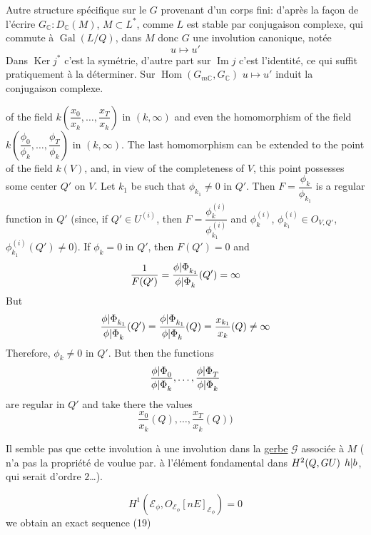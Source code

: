 Autre structure spécifique sur le $G$ provenant d'un corps fini: d'après la façon de l'écrire $G_{\mathbb C}:D_{\mathbb C}(M)$, $M\subset L^*$, comme $L$ est stable par conjugaison complexe, qui commute à $\operatorname{Gal}(L/Q)$,  dans $M$ donc $G$ une involution canonique, notée
\[
u\longmapsto u'
\]
Dans $\operatorname{Ker}j^*$ c'est la symétrie, d'autre part sur $\operatorname{Im}j$ c'est l'identité, ce qui suffit pratiquement à la déterminer. Sur $\operatorname{Hom}(G_{m\mathbb C},G_{\mathbb C})$ $u\mapsto u'$ induit la conjugaison complexe.

of the field $k(\dfrac{x_0}{x_k},\ldots,\dfrac{x_T}{x_k})$ in $(k,\infty)$ and even the homomorphism of the field $k(\dfrac{\phi_0}{\phi_k},\ldots,\dfrac{\phi_T}{\phi_k})$ in $(k,\infty)$. The last homomorphism can be extended to the point of the field $k(V)$, and, in view of the completeness of $V$, this point possesses some center $Q'$ on $V$. Let $k_1$ be such that $\phi_{k_1}\ne0$ in $Q'$. Then $F=\dfrac{\phi_k}{\phi_{k_1}}$ is a regular function in $Q'$ (since, if $Q'\in U^{(i)}$, then $F=\dfrac{\phi_k^{(i)}}{\phi_{k_1}^{(i)}}$ and $\phi_k^{(i)}$, $\phi_{k_1}^{(i)}\in O_{V,Q'}$, $\phi_{k_1}^{(i)}(Q')\ne0$). If $\phi_k=0$ in $Q'$, then $F(Q')=0$ and
\[
\frac{1}{F(Q')}=\frac{{\phi|\Phi}_{k_1}}{{\phi|\Phi}_k}(Q')=\infty
\]
But
\[
\frac{{\phi|\Phi}_{k_1}}{{\phi|\Phi}_k}(Q')=\frac{{\phi|\Phi}_{k_1}}{{\phi|\Phi}_k}(Q)=\frac{x_{k_1}}{x_k}(Q)\ne\infty
\]
Therefore, $\phi_k\ne0$ in $Q'$. But then the functions
\[
\frac{{\phi|\Phi}_0}{{\phi|\Phi}_k},\ldots,\frac{{\phi|\Phi}_T}{{\phi|\Phi}_k}
\]
are regular in $Q'$ and take there the values
\[
\frac{x_0}{x_k}(Q),\ldots,\frac{x_T}{x_k}(Q))
\]

Il  semble pas que cette involution  à une involution dans la \uline{gerbe} $\mathcal G$ associée à $M$ (   n'a pas la propriété de  voulue par. à l'élément fondamental  dans $H^2(Q,{{G}}U)$ ${h|b}$, qui serait  d'ordre  $2$\ldots).

\[
H^1(\mathcal E_\phi,O_{\mathcal E_\phi}[nE]_{\mathcal E_\phi})=0
\]
we obtain an exact sequence
\hfill(19)

